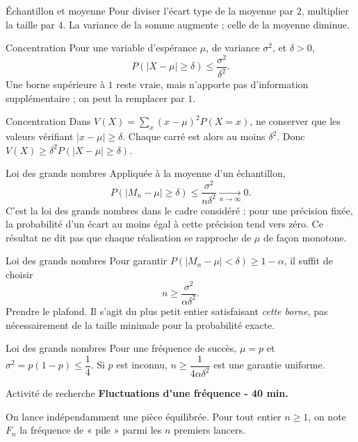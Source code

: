 \documentclass[aspectratio=169,10pt]{beamer}
\begin{document}
\begin{frame}{Échantillon et moyenne}
Pour diviser l'écart type de la moyenne par \(2\), multiplier la taille par \(4\). La variance de la somme augmente ; celle de la moyenne diminue.
\end{frame}
\begin{frame}{Concentration}
Pour une variable d'espérance \(\mu\), de variance \(\sigma^2\), et \(\delta>0\),
\[P(|X-\mu|\ge\delta)\le\dfrac{\sigma^2}{\delta^2}.\]
Une borne supérieure à \(1\) reste vraie, mais n'apporte pas d'information supplémentaire ; on peut la remplacer par \(1\).
\end{frame}
\begin{frame}{Concentration}
Dans \(V(X)=\sum_x(x-\mu)^2P(X=x)\), ne conserver que les valeurs vérifiant \(|x-\mu|\ge\delta\). Chaque carré est alors au moins \(\delta^2\). Donc \(V(X)\ge\delta^2P(|X-\mu|\ge\delta)\).
\end{frame}
\begin{frame}{Loi des grands nombres}
Appliquée à la moyenne d'un échantillon,
\[P(|M_n-\mu|\ge\delta)\le\dfrac{\sigma^2}{n\delta^2}\xrightarrow[n\to\infty]{}0.\]
C'est la loi des grands nombres dans le cadre considéré : pour une précision fixée, la probabilité d'un écart au moins égal à cette précision tend vers zéro. Ce résultat ne dit pas que chaque réalisation se rapproche de \(\mu\) de façon monotone.
\end{frame}
\begin{frame}{Loi des grands nombres}
Pour garantir \(P(|M_n-\mu|<\delta)\ge1-\alpha\), il suffit de choisir
\[n\ge\dfrac{\sigma^2}{\alpha\delta^2}.\]
Prendre le plafond. Il s'agit du plus petit entier satisfaisant \emph{cette borne}, pas nécessairement de la taille minimale pour la probabilité exacte.
\end{frame}
\begin{frame}{Loi des grands nombres}
Pour une fréquence de succès, \(\mu=p\) et \(\sigma^2=p(1-p)\le\dfrac{1}{4}\). Si \(p\) est inconnu, \(n\ge\dfrac{1}{4\alpha\delta^2}\) est une garantie uniforme.
\end{frame}
\begin{frame}{Activité de recherche}
\textbf{Fluctuations d'une fréquence - 40 min.}

On lance indépendamment une pièce équilibrée. Pour tout entier \(n\ge1\), on note \(F_n\) la fréquence de « pile » parmi les \(n\) premiers lancers.
\end{frame}
\end{document}
